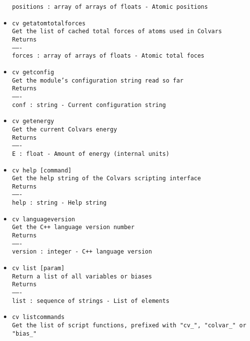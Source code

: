 \begin{itemize}
\texttt{positions : array of arrays of floats - Atomic positions}
\item \texttt{cv getatomtotalforces}
\\
\texttt{Get the list of cached total forces of atoms used in Colvars}
\\
\texttt{Returns}
\\
\texttt{-------}
\\
\texttt{forces : array of arrays of floats - Atomic total foces}
\item \texttt{cv getconfig}
\\
\texttt{Get the module's configuration string read so far}
\\
\texttt{Returns}
\\
\texttt{-------}
\\
\texttt{conf : string - Current configuration string}
\item \texttt{cv getenergy}
\\
\texttt{Get the current Colvars energy}
\\
\texttt{Returns}
\\
\texttt{-------}
\\
\texttt{E : float - Amount of energy (internal units)}
\item \texttt{cv help [command]}
\\
\texttt{Get the help string of the Colvars scripting interface}
\\
\texttt{Returns}
\\
\texttt{-------}
\\
\texttt{help : string - Help string}
\item \texttt{cv languageversion}
\\
\texttt{Get the C++ language version number}
\\
\texttt{Returns}
\\
\texttt{-------}
\\
\texttt{version : integer - C++ language version}
\item \texttt{cv list [param]}
\\
\texttt{Return a list of all variables or biases}
\\
\texttt{Returns}
\\
\texttt{-------}
\\
\texttt{list : sequence of strings - List of elements}
\item \texttt{cv listcommands}
\\
\texttt{Get the list of script functions, prefixed with "cv\_", "colvar\_" or "bias\_"}
\\

\end{itemize}
